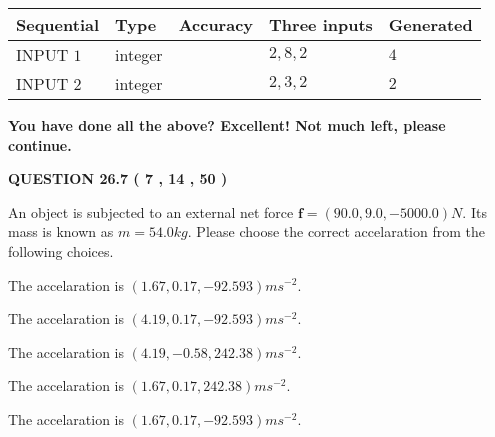 \documentclass[12pt]{article}
\begin{document}
   
  
  
\noindent\begin{tabular}{|l|l|l|l|l|}
\hline
 Sequential & Type & Accuracy & Three inputs & Generated \\ 
\hline
 
 
  INPUT $            1 $ & integer &  & $
 2
 , 
 8
 , 
 2
 $ & $ 4 $ 
 \\  \hline  
 
 
  INPUT $            2 $ & integer &  & $
 2
 , 
 3
 , 
 2
 $ & $ 2 $ 
 \\  \hline  
 \end{tabular}
   
   
   
   
\vspace{0.3in}
{\textbf{\LARGE{You have done all the above? Excellent! Not much left, please continue.}}}
\vspace{0.3in}
   
   
  
\vspace{0.2in}
  
{\textbf{\Large{QUESTION
26.7 
 (           7 ,          14 ,          50 )
}}}
  
  
 
An object is subjected to an external net force $\mathbf{f}=
(90.0 , 9.0 , -5000.0) N$.
Its mass is known as $m= %
54.0 kg$.
Please choose the correct accelaration from the following choices.
 
 
  The accelaration is $  %
(
1.67,
0.17,
-92.593)
ms^{-2} $.
 
 
  The accelaration is $  %
(
4.19,
0.17,
-92.593)
ms^{-2} $.
 
 
  The accelaration is $  %
(
4.19,
-0.58,
242.38)
ms^{-2} $.
 
 
  The accelaration is $  %
(
1.67,
0.17,
242.38)
ms^{-2} $.
 
 
\noindent{}
 
 
  The accelaration is $  %
(
1.67,
0.17,
-92.593)
ms^{-2} $.
 
 
\noindent{}
 
 
 
 
 
\noindent{}
 
\end{document}
